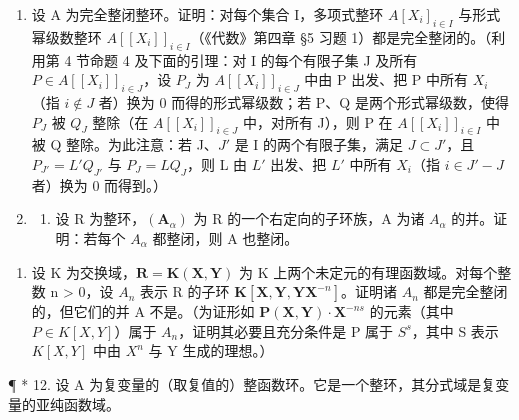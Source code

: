 \begin{enumerate}
\item
  设 A 为完全整闭整环。证明：对每个集合 I，多项式整环 \(A[X_{i}]_{i \in I}\) 与形式幂级数整环 \(A[[X_{i}]]_{i \in I}\)（《代数》第四章 §5 习题 1）都是完全整闭的。（利用第 4 节命题 4 及下面的引理：对 I 的每个有限子集 J 及所有 \(P \in A[[X_{i}]]_{i \in J}\)，设 \(P_{J}\) 为 \(A[[X_{i}]]_{i \in J}\) 中由 P 出发、把 P 中所有 \(X_{i}\)（指 \(i \notin J\) 者）换为 0 而得的形式幂级数；若 P、Q 是两个形式幂级数，使得 \(P_{J}\) 被 \(Q_{J}\) 整除（在 \(A[[X_{i}]]_{i \in J}\) 中，对所有 J），则 P 在 \(A[[X_{i}]]_{i \in I}\) 中被 Q 整除。为此注意：若 J、\(J'\) 是 I 的两个有限子集，满足 \(J \subset J'\)，且 \(P_{J'} = L'Q_{J'}\) 与 \(P_{J} = LQ_{J}\)，则 L 由 \(L'\) 出发、把 \(L'\) 中所有 \(X_{i}\)（指 \(i \in J' - J\) 者）换为 0 而得到。）
\item
  \begin{enumerate}
  \def\labelenumii{(\alph{enumii})}
  \tightlist
  \item
    设 R 为整环，\((\mathbf{A}_{\alpha})\) 为 R 的一个右定向的子环族，A 为诸 \(A_{\alpha}\) 的并。证明：若每个 \(A_{\alpha}\) 都整闭，则 A 也整闭。
  \end{enumerate}
\end{enumerate}

\begin{enumerate}
\def\labelenumi{(\alph{enumi})}
\setcounter{enumi}{1}
\tightlist
\item
  设 K 为交换域，\(\mathbf{R} = \mathbf{K}(\mathbf{X}, \mathbf{Y})\) 为 K 上两个未定元的有理函数域。对每个整数 n \textgreater{} 0，设 \(A_{n}\) 表示 R 的子环 \(\mathbf{K}[\mathbf{X}, \mathbf{Y}, \mathbf{Y}\mathbf{X}^{-n}]\)。证明诸 \(A_{n}\) 都是完全整闭的，但它们的并 A 不是。（为证形如 \(\mathbf{P}(\mathbf{X}, \mathbf{Y}) \cdot \mathbf{X}^{-ns}\) 的元素（其中 \(P \in K[X, Y]\)）属于 \(A_{n}\)，证明其必要且充分条件是 P 属于 \(S^{s}\)，其中 S 表示 \(K[X, Y]\) 中由 \(X^{n}\) 与 Y 生成的理想。）
\end{enumerate}

¶ * 12. 设 A 为复变量的（取复值的）整函数环。它是一个整环，其分式域是复变量的亚纯函数域。

